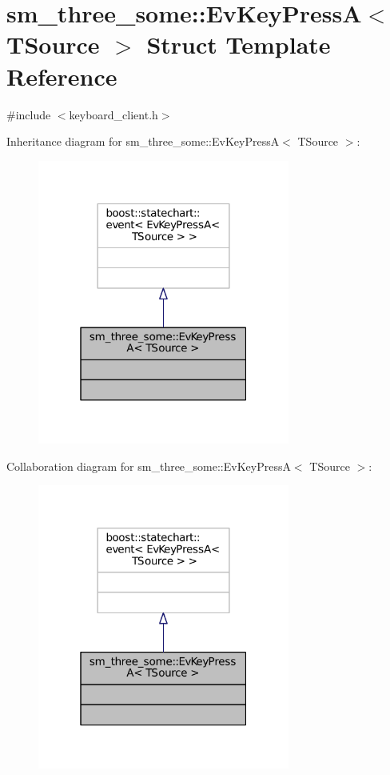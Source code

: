 \hypertarget{structsm__three__some_1_1EvKeyPressA}{}\section{sm\+\_\+three\+\_\+some\+:\+:Ev\+Key\+PressA$<$ T\+Source $>$ Struct Template Reference}
\label{structsm__three__some_1_1EvKeyPressA}


{\ttfamily \#include $<$keyboard\+\_\+client.\+h$>$}



Inheritance diagram for sm\+\_\+three\+\_\+some\+:\+:Ev\+Key\+PressA$<$ T\+Source $>$\+:
\nopagebreak
\begin{figure}[H]
\begin{center}
\leavevmode
\includegraphics[width=235pt]{structsm__three__some_1_1EvKeyPressA__inherit__graph}
\end{center}
\end{figure}


Collaboration diagram for sm\+\_\+three\+\_\+some\+:\+:Ev\+Key\+PressA$<$ T\+Source $>$\+:
\nopagebreak
\begin{figure}[H]
\begin{center}
\leavevmode
\includegraphics[width=235pt]{structsm__three__some_1_1EvKeyPressA__coll__graph}
\end{center}
\end{figure}


